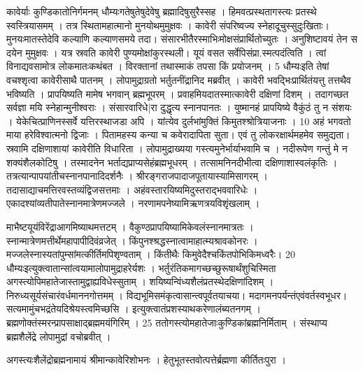 कावेर्याः कुण्डिकातोनिर्गमनम् धौम्यःगतेषुतेषुदेवेषु ब्रह्मादिषुसुरैस्सह ।
 हिमवत्प्रस्थतागस्त्यः प्रतस्थे स्वस्त्रियासमम् ।
 तत्र स्थितामहात्मानो मुनयोथमुमुक्षवः ।
 कावेरी संपरिष्वज्य स्नेहादूचुस्सुदुःखिताः।
 मुनयःमातस्तेदेवि कल्याणि कल्याणसमये तदा।
 संसारभीतैरस्माभिःमोक्षसंप्रार्थितोच्युतः ।
 अनुशिष्टावयं तेन स दयेन मुमुक्षवः ।
 यत्र स्रवति कावेरी पुण्यमोक्षांकुरस्थली।
 यूयं वसत सर्वेपिसंप्रा.स्मत्पदंत्विति ।
 त्वां विनाद्यवसामोत्र लोकमातःकथंबत ।
 विरक्तानां तथास्माकं तपसा किं प्रयोजनम् ।
 5 धौम्यःइति तेषां वचश्शृत्वा कावेरीसाथै पातनम् ।
 लोपामुद्राग्रतो भर्तुतनींद्रानिद मब्रवीत् ।
 कावेरी
भवद्भिःप्रार्थितंयत्तु तत्तथैव भविष्यति ।
 प्रापयिष्यति मामेष भगवान् ब्रह्मभूपरम् ।
 प्रवाहमियदातस्मात्कावेरी दक्षिणां दिशम् ।
 तदागच्छत सर्वज्ञा मयि स्नेहान्मुनीश्वराः ।
 संसारवारिधे|रा दुद्धृत्य स्नानपानतः ।
 युष्मानहं प्रापयिष्ये वैकुंठं तु न संशयः ।
 येकेचित्प्राणिनस्सर्वे यत्तिरस्थाजडा अपि ।
 यांत्येव दुर्लभांमुक्तिं किमुतश्श्रोत्रियाजनाः ।
 10 अहं भगवतो माया हरेविश्वात्मनो द्विजाः ।
 पितामहस्य कन्या च कवेरादापिता सुता।
 एवं तु लोकरक्षार्थमहमेव समुद्यता।
 स्रवामि दक्षिणाशायां कावेरीति विधारिता ।
 लोपामुद्राख्यया गस्त्यमुनेर्भार्याभवामि च ।
 नदीरूपेण गन्तुं मे न शक्यंशैलकोटिषु ।
 तस्मादनेन भर्ताद्यप्राप्यसेहंब्रह्मभूधरम् ।
 तत्सामनिनदीभीत्वा दक्षिणाशास्वलंकृतिः ।
 तत्रत्यान्पापयांतीचस्नानपानादिदर्शनैः ।
 श्रीरङ्गराजपादाजपूतायास्यामिसागरम् ।
 तदासाद्याचमत्तिरवस्तव्यंद्विजसत्तमाः ।
 अहंवस्तारयिष्यमिदुस्तराद्भववारिधेः ।
 एकादश्यांव्यतीपातेस्नानमात्रेणमज्जले ।
 नरणामपनेष्यामिऋणत्रयविशृंखलाम् ।
 
माभैष्टयूयंविरेंद्राआगमिष्याथमत्तटम् ।
 वैकुण्ठप्रापयिष्यामिकेवलंस्नानमात्रतः ।
 स्नान्मात्रेणमत्तीर्थेमहापापीदिवंव्रजेत् ।
 किंपुनश्श्रद्धस्नात्वामाहात्म्यश्रावकोनरः ।
 मज्जलेस्नास्यतांपुम्सांमत्कीर्तिमपिशृण्वताम् ।
 किंतीथैः किमुवेदैश्चकिंतपोभिकिमध्वरैः।
 20 धौम्यःइत्युक्त्वातान्सांत्वयामालोपामुद्राहरेर्यशः ।
 भर्तुरंतिकमागच्छच्छुरूषार्थंशुचिस्मिता अगस्त्योपिमहातेजास्तामुद्वाह्यविधेस्सुताम् ।
 शयिष्यन्विंध्यशैलंप्रतस्थेदक्षिणांदिशम् ।
 निरुध्यसूर्यसंचारंवर्धमाननगोत्तमम् ।
 विद्यभूमिसमंकृत्वासान्त्वपूर्वतयाचया।
 मदागमनपर्यन्तंएवंवर्तस्वभूधर।
 सत्यमामुंचभद्रंतेयदिश्रेयस्त्वमिच्छसि ।
 इत्युक्त्वातंप्रशस्याथकरेणालंब्यतनगम् ।
 ब्रह्मणोक्तंस्मरन्प्रापसाक्षाद्ब्रह्ममयंगिरिम् ।
 25 ततोगस्त्योमहातेजाःकुण्डिकांब्रह्मनिर्मिताम् ।
 संस्थाप्य ब्रह्मशैलेंद्रे लोपामुद्रां वचोब्रवीत् ।
 
अगस्त्यःशैलेंद्रोब्रह्मनामायं श्रीमान्कावेरिशोभनः ।
 हेतुभूतस्तवोत्पत्तेर्ब्रह्मणा कीर्तितःपुरा ।
 
